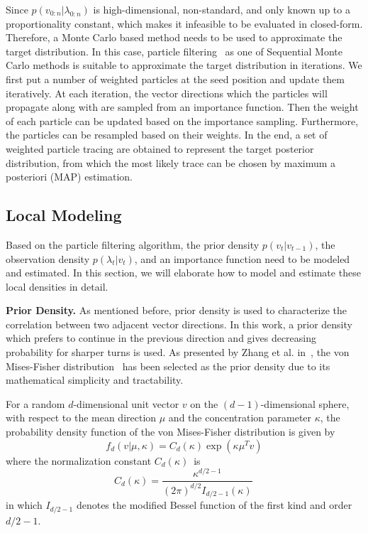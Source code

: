 Since $p({v_{0:n}}|{\lambda_{0:n}})$ is high-dimensional, non-standard, and only known up to a proportionality constant, which makes it infeasible to be evaluated in closed-form. Therefore, a Monte Carlo based method needs to be used to approximate the target distribution. In this case, particle filtering~\cite{doucet2001sequential} as one of Sequential Monte Carlo methods is suitable to approximate the target distribution in iterations. We first put a number of weighted particles at the seed position and update them iteratively. At each iteration, the vector directions which the particles will propagate along with are sampled from an importance function. Then the weight of each particle can be updated based on the importance sampling. Furthermore, the particles can be resampled based on their weights. In the end, a set of weighted particle tracing are obtained to represent the target posterior distribution, from which the most likely trace can be chosen by maximum a posteriori (MAP) estimation.

\subsection{Local Modeling}

Based on the particle filtering algorithm, the prior density $p({v_t}|{v_{t - 1}})$, the observation density $p({\lambda_t}|{v_t})$, and an importance function need to be modeled and estimated. In this section, we will elaborate how to model and estimate these local densities in detail.

\noindent\textbf{Prior Density.} As mentioned before, prior density is used to characterize the correlation between two adjacent vector directions. In this work, a prior density which prefers to continue in the previous direction and gives decreasing probability for sharper turns is used. As presented by Zhang et al. in~\cite{Zhang20095}, the von Mises-Fisher distribution~\cite{fisher} has been selected as the prior density due to its mathematical simplicity and tractability.

For a random $d$-dimensional unit vector $v$ on the $(d-1)$-dimensional sphere, with respect to the mean direction $\mu$ and the concentration parameter $\kappa$, the probability density function of the von Mises-Fisher distribution is given by
\begin{equation}
  f_{d}(v| \mu, \kappa)=C_{d}(\kappa)\exp \left( {\kappa \mu^T v } \right)
\end{equation}
where the normalization constant $C_{d}(\kappa)\,$ is
\begin{equation}
  C_{d}(\kappa)=\frac {\kappa^{d/2-1}} {(2\pi)^{d/2}I_{d/2-1}(\kappa)} \,
\end{equation}
in which $I_{d/2-1}$ denotes the modified Bessel function of the first kind and order $d/2-1$.

